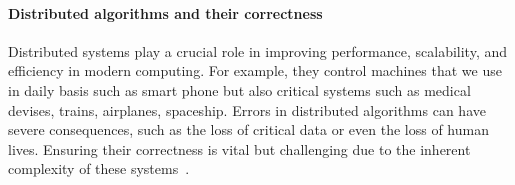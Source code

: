 





\paragraph{Distributed algorithms and their correctness}
Distributed systems play a crucial role in improving performance, 
scalability, and efficiency in modern computing.
For example, they control machines that we use in daily basis such as smart phone but also critical systems such as medical devises, trains, airplanes, spaceship. Errors in distributed algorithms can have severe consequences, such as the loss of critical data or even the loss of human lives. 
Ensuring their correctness is vital but challenging due to the inherent complexity of these systems~\cite{heiser2010theroad, lamport2019thebyzantine}.


